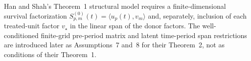 Han and Shah's Theorem~1 structural model requires a finite-dimensional survival factorization \(S^{(0)}_{p,m}(t)=\langle u_p(t),v_m\rangle\) and, separately, inclusion of each treated-unit factor \(v_\star\) in the linear span of the donor factors.  The well-conditioned finite-grid pre-period matrix and latent time-period span restrictions are introduced later as Assumptions~7 and~8 for their Theorem~2, not as conditions of their Theorem~1.
